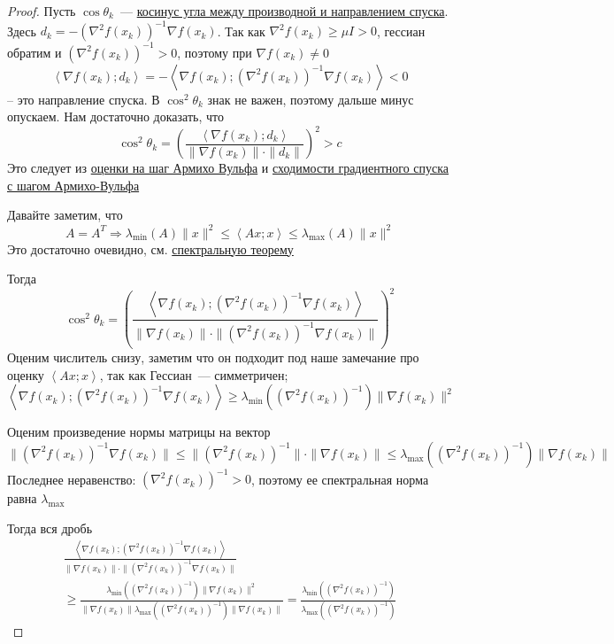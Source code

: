 \begin{proof}
  Пусть $\cos \theta_k$~--- \hyperref[note:E4AE9B25-BDB9-4A54-8CCB-09809F20B79D]{косинус угла между производной и направлением спуска}.
  Здесь $d_k = -(\nabla^2 f(x_k))^{-1} \nabla f(x_k)$. Так как $\nabla^2 f(x_k) \ge \mu I > 0$, гессиан обратим и $(\nabla^2 f(x_k))^{-1} > 0$, поэтому при $\nabla f(x_k) \ne 0$
  \[
  \left\langle \nabla f(x_k); d_k \right\rangle = - \left\langle \nabla f(x_k); (\nabla^2 f(x_k))^{-1} \nabla f(x_k) \right\rangle < 0
  \]
  -- это направление спуска. В $\cos^2 \theta_k$ знак не важен, поэтому дальше минус опускаем.
  Нам достаточно доказать, что
  \[
  \cos^2 \theta_k = \left( \frac{\left\langle \nabla f(x_k); d_k \right\rangle}{\|\nabla f(x_k)\| \cdot \| d_k \|} \right)^2 > c
  \]
  Это следует из \hyperref[note:93FC9CC4-79FA-4CEA-9B10-9DBFB2C07850]{оценки на шаг Армихо Вульфа} и \hyperref[note:36F6E1BA-41DB-460D-A9C6-B980621727D4]{сходимости градиентного спуска с шагом Армихо-Вульфа}

  Давайте заметим, что
  \[
  A = A^T \Rightarrow \lambda_{\min}(A) \|x\|^2 \le \left\langle Ax;x \right\rangle \le \lambda_{\max}(A) \|x\|^2
  \]
  Это достаточно очевидно, см. \hyperref[note:3BE0BBCE-AAB0-4CB4-8FA6-45277C0889CF]{спектральную теорему}

  Тогда
  \[
  \cos^2 \theta_k = \left( \frac{\left\langle \nabla f(x_k); (\nabla^2 f(x_k))^{-1} \nabla f(x_k) \right\rangle}{\|\nabla f(x_k) \| \cdot \| (\nabla^2 f(x_k))^{-1} \nabla f(x_{k})\|} \right)^2
  \]
  Оценим числитель снизу, заметим что он подходит под наше замечание про оценку $\left\langle Ax;x \right\rangle$,
  так как Гессиан~--- симметричен;
  \[
  \left\langle \nabla f(x_k); (\nabla^2 f(x_k))^{-1} \nabla f(x_k) \right\rangle \ge
  \lambda_{\min}\left ((\nabla^2 f(x_k))^{-1}\right) \|\nabla f(x_k)\|^2
  \]

  Оценим произведение нормы матрицы на вектор
  \[
  \| (\nabla^2 f(x_k))^{-1} \nabla f(x_{k})\| \le \|(\nabla^2 f(x_k))^{-1}\| \cdot \|\nabla f(x_k)\|
  \le \lambda_{\max}\left ((\nabla^2 f(x_k))^{-1} \right) \|\nabla f(x_k)\|
  \]
  Последнее неравенство: $(\nabla^2 f(x_k))^{-1} > 0$, поэтому ее спектральная норма равна $\lambda_{\max}$

  Тогда вся дробь
  \begin{multline*}
  \frac{\left\langle \nabla f(x_k); (\nabla^2 f(x_k))^{-1} \nabla f(x_k) \right\rangle}{\|\nabla f(x_k) \| \cdot \| (\nabla^2 f(x_k))^{-1} \nabla f(x_{k})\|} \\
  \ge \frac{\lambda_{\min}\left ((\nabla^2 f(x_k))^{-1}\right) \|\nabla f(x_k)\|^2
  }{
  \|\nabla f(x_k)\| \lambda_{\max}\left ((\nabla^2 f(x_k))^{-1} \right) \|\nabla f(x_k)\|
  } = \frac{\lambda_{\min}\left ((\nabla^2 f(x_k))^{-1}\right)}{\lambda_{\max}\left ((\nabla^2 f(x_k))^{-1} \right)}
  \end{multline*}


\end{proof}
